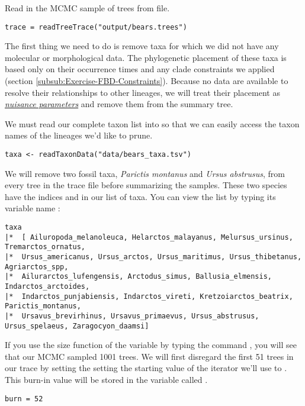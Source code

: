 Read in the MCMC sample of trees from file.
{\tt \begin{snugshade*}
\begin{lstlisting}
trace = readTreeTrace("output/bears.trees")
\end{lstlisting}
\end{snugshade*}}


The first thing we need to do is remove taxa for which we did not have any molecular or morphological data.
The phylogenetic placement of these taxa is based only on their occurrence times and any clade constraints we applied (section \ref{subsub:Exercise-FBD-Constraints}). 
Because no data are available to resolve their relationships to other lineages, we will treat their placement as \href{https://en.wikipedia.org/wiki/Nuisance_parameter}{\textit{nuisance parameters}} and remove them from the summary tree.

We must read our complete taxon list into \RevBayes so that we can easily access the taxon names of the lineages we'd like to prune.
{\tt \begin{snugshade*}
\begin{lstlisting}
taxa <- readTaxonData("data/bears_taxa.tsv")
\end{lstlisting}
\end{snugshade*}}

We will 
remove two fossil taxa, \textit{Parictis montanus} and \textit{Ursus abstrusus}, from every tree in the trace file before summarizing the samples.
These two species have the indices  and  in our list of taxa. 
You can view the list by typing its variable name :
{\tt \begin{snugshade*}
\begin{lstlisting}
taxa 
|*  [ Ailuropoda_melanoleuca, Helarctos_malayanus, Melursus_ursinus, Tremarctos_ornatus,
|*  Ursus_americanus, Ursus_arctos, Ursus_maritimus, Ursus_thibetanus, Agriarctos_spp,
|*  Ailurarctos_lufengensis, Arctodus_simus, Ballusia_elmensis, Indarctos_arctoides,
|*  Indarctos_punjabiensis, Indarctos_vireti, Kretzoiarctos_beatrix, Parictis_montanus,
|*  Ursavus_brevirhinus, Ursavus_primaevus, Ursus_abstrusus, Ursus_spelaeus, Zaragocyon_daamsi]
\end{lstlisting}
\end{snugshade*}}

If you use the size function of the  variable by typing the command \colorbox{shadecolor}{}, you will see that our MCMC sampled 1001 trees. 
We will first disregard the first 51 trees in our trace by setting the setting the starting value of the iterator we'll use to . 
This burn-in value will be stored in the variable called .
{\tt \begin{snugshade*}
\begin{lstlisting}
burn = 52
\end{lstlisting}
\end{snugshade*}}

